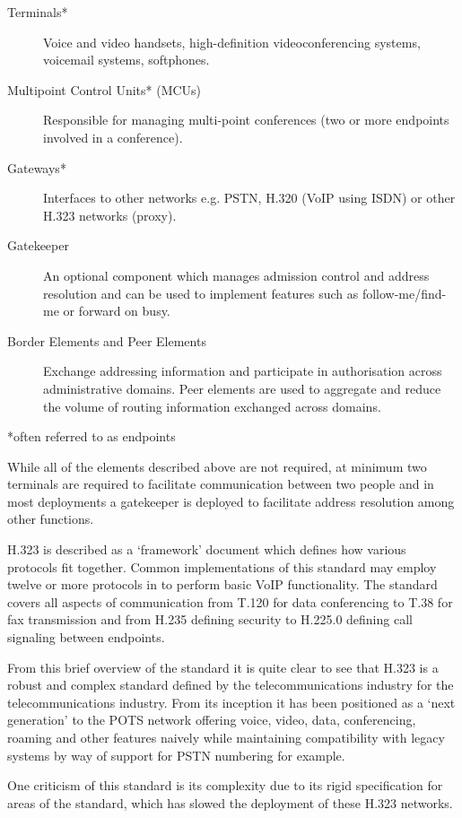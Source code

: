 \begin{description}
\item[Terminals*] Voice and video handsets, high-definition videoconferencing systems, voicemail systems, softphones.
\item[Multipoint Control Units* (MCUs)] Responsible for managing multi-point conferences (two or more endpoints involved in  a conference).
\item[Gateways*] Interfaces to other networks e.g. PSTN, H.320 (VoIP using ISDN) or other H.323 networks (proxy).
\item[Gatekeeper] An optional component which manages admission control and address resolution and can be used to implement features such as follow-me/find-me or forward on busy.
\item[Border Elements and Peer Elements] Exchange addressing information and participate in authorisation across administrative domains. Peer elements are used to aggregate and reduce the volume of routing information exchanged across domains.
\end{description} 
*often referred to as endpoints

While all of the elements described above are not required, at minimum two terminals are required to facilitate communication between two people and in most deployments a gatekeeper is deployed to facilitate address resolution among other functions.

H.323 is described as a ‘framework’ document which defines how various protocols fit together. Common implementations of this standard may employ twelve or more protocols in to perform basic VoIP functionality. The standard covers all aspects of communication from T.120 for data conferencing to T.38 for fax transmission and from H.235 defining security to H.225.0 defining call signaling between endpoints.

From this brief overview of the standard it is quite clear to see that H.323 is a robust and complex standard defined by the telecommunications industry for the telecommunications industry. From its inception it has been positioned as a ‘next generation’ to the POTS network offering voice, video, data, conferencing, roaming and other features naively while maintaining compatibility with legacy systems by way of support for PSTN numbering for example.

One criticism of this standard is its complexity due to its rigid specification for areas of the standard, which has slowed the deployment of these H.323 networks.

